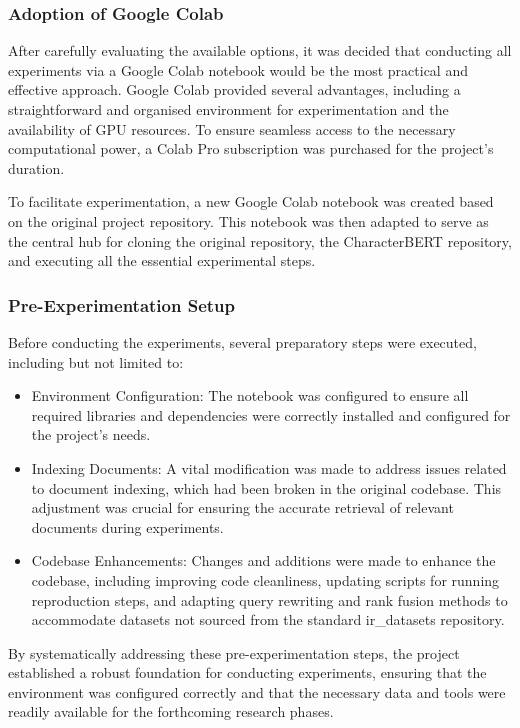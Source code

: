 \subsubsection{Adoption of Google Colab}
After carefully evaluating the available options, it was decided that conducting all experiments via a Google Colab notebook would be the most practical and effective approach. Google Colab provided several advantages, including a straightforward and organised environment for experimentation and the availability of GPU resources. To ensure seamless access to the necessary computational power, a Colab Pro subscription was purchased for the project's duration.

To facilitate experimentation, a new Google Colab notebook was created based on the original project repository. This notebook was then adapted to serve as the central hub for cloning the original repository, the CharacterBERT repository, and executing all the essential experimental steps.

\subsubsection{Pre-Experimentation Setup}
Before conducting the experiments, several preparatory steps were executed, including but not limited to:

\begin{itemize}
    \item Environment Configuration: The notebook was configured to ensure all required libraries and dependencies were correctly installed and configured for the project's needs.
    \item Indexing Documents: A vital modification was made to address issues related to document indexing, which had been broken in the original codebase. This adjustment was crucial for ensuring the accurate retrieval of relevant documents during experiments.
    \item Codebase Enhancements: Changes and additions were made to enhance the codebase, including improving code cleanliness, updating scripts for running reproduction steps, and adapting query rewriting and rank fusion methods to accommodate datasets not sourced from the standard ir\_datasets repository.
\end{itemize}

By systematically addressing these pre-experimentation steps, the project established a robust foundation for conducting experiments, ensuring that the environment was configured correctly and that the necessary data and tools were readily available for the forthcoming research phases.

